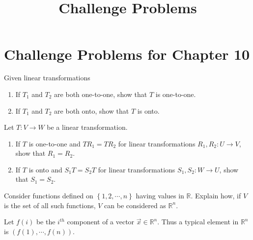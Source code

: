 \documentclass{ximera}
\title{Challenge Problems} \license{CC BY-NC-SA 4.0}
\begin{document}
\begin{abstract}
\end{abstract}
\maketitle

\section*{Challenge Problems for Chapter 10}

\begin{problem}\label{prob:nich7.3.10}
    Given linear transformations 
    \begin{center}
\end{center}
\begin{enumerate}
    \item If $T_1$ and $T_2$ are both one-to-one, show that $T$ is one-to-one.
    \item If $T_1$ and $T_2$ are both onto, show that $T$ is onto.
\end{enumerate}
\end{problem}

\begin{problem}\label{prob:7.3.11}
Let $T:V\rightarrow W$ be a linear transformation.
\begin{enumerate}
    \item If $T$ is one-to-one and $TR_1=TR_2$ for linear transformations $R_1,R_2:U\rightarrow V$, show that $R_1=R_2$.
    \item If $T$ is onto and $S_1T=S_2T$ for linear transformations $S_1,S_2:W\rightarrow U$, show that $S_1=S_2$.
\end{enumerate}
    \end{problem}

\begin{problem}\label{prb:10.21} Consider functions defined on $\left\{ 1,2,\cdots ,n\right\} $ having
values in $\mathbb{R}$. Explain how, if $V$ is the set of all such
functions, $V$ can be considered as $\mathbb{R}^{n}$.
\begin{hint}
Let $f\left( i\right) $ be the $i^{th}$ component of a vector $
\vec{x}\in \mathbb{R}^{n}$. Thus a typical element in $\mathbb{R}^{n}$ is $
\left( f\left( 1\right) ,\cdots ,f\left( n\right) \right) $.
\end{hint}
\end{problem}
\end{document}
